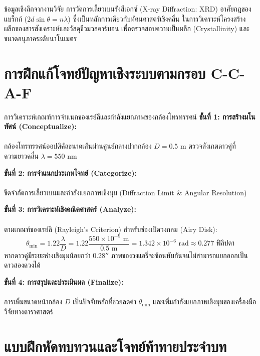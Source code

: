 \begin{researchbox}{ข้อมูลเชิงลึกจากงานวิจัย}
การวัดการเลี้ยวเบนรังสีเอกซ์ (X-ray Diffraction: XRD) อาศัยกฎของแบร็กก์ ($2d\sin\theta = n\lambda$) ซึ่งเป็นหลักการเดียวกับทัศนศาสตร์เชิงคลื่น ในการวิเคราะห์โครงสร้างผลึกของสารสังเคราะห์และวัสดุชีวมวลคาร์บอน เพื่อตรวจสอบความเป็นผลึก (Crystallinity) และขนาดอนุภาคระดับนาโนเมตร
\end{researchbox}

\section{การฝึกแก้โจทย์ปัญหาเชิงระบบตามกรอบ C-C-A-F}

\begin{ccafsolution}{การวิเคราะห์เกณฑ์การจำแนกของเรย์ลีและกำลังแยกภาพของกล้องโทรทรรศน์}
\textbf{ขั้นที่ 1: การสร้างมโนทัศน์ (Conceptualize):}\\\\ กล้องโทรทรรศน์ออปติคัลขนาดเส้นผ่านศูนย์กลางปากกล้อง $D = 0.5\text{ m}$ ตรวจสังเกตดาวคู่ที่ความยาวคลื่น $\lambda = 550\text{ nm}$

\vspace{4pt}
\textbf{ขั้นที่ 2: การจำแนกประเภทโจทย์ (Categorize):}\\\\ ขีดจำกัดการเลี้ยวเบนและกำลังแยกภาพเชิงมุม (Diffraction Limit \& Angular Resolution)

\vspace{4pt}
\textbf{ขั้นที่ 3: การวิเคราะห์เชิงคณิตศาสตร์ (Analyze):}\\\\ ตามเกณฑ์ของเรย์ลี (Rayleigh's Criterion) สำหรับช่องเปิดวงกลม (Airy Disk):
\begin{equation}
\theta_{\text{min}} = 1.22 \frac{\lambda}{D} = 1.22 \frac{550 \times 10^{-9}\text{ m}}{0.5\text{ m}} = 1.342 \times 10^{-6}\text{ rad} \approx 0.277\text{ ฟิลิปดา}
\end{equation}
หากดาวคู่มีระยะห่างเชิงมุมน้อยกว่า $0.28''$ ภาพของวงแอรี่จะซ้อนทับกันจนไม่สามารถแยกออกเป็นดาวสองดวงได้

\vspace{4pt}
\textbf{ขั้นที่ 4: การสรุปและประเมินผล (Finalize):}\\\\ การเพิ่มขนาดหน้ากล้อง $D$ เป็นปัจจัยหลักที่ช่วยลดค่า $\theta_{\text{min}}$ และเพิ่มกำลังแยกภาพเชิงมุมของเครื่องมือวิจัยทางดาราศาสตร์
\end{ccafsolution}

\section{แบบฝึกหัดทบทวนและโจทย์ท้าทายประจำบท}

